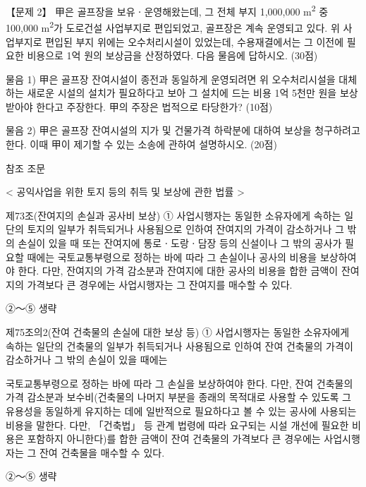 \begin{longquestion}{【문제 2】}
甲은 골프장을 보유ㆍ운영해왔는데, 그 전체 부지 1,000,000 m\textsuperscript{2} 중 100,000 m\textsuperscript{2}가 도로건설 사업부지로 편입되었고, 골프장은 계속 운영되고 있다. 위 사업부지로 편입된 부지 위에는 오수처리시설이 있었는데, 수용재결에서는 그 이전에 필요한 비용으로 1억 원의 보상금을 산정하였다. 다음 물음에 답하시오. (30점) \par
\medskip\noindent 물음 1) 甲은 골프장 잔여시설이 종전과 동일하게 운영되려면 위 오수처리시설을 대체하는 새로운 시설의 설치가 필요하다고 보아 그 설치에 드는 비용 1억 5천만 원을 보상받아야 한다고 주장한다. 甲의 주장은 법적으로 타당한가? (10점) \par
\medskip\noindent 물음 2) 甲은 골프장 잔여시설의 지가 및 건물가격 하락분에 대하여 보상을 청구하려고 한다. 이때 甲이 제기할 수 있는 소송에 관하여 설명하시오. (20점) \par
\begin{framedtext}
참조 조문 \par
< 공익사업을 위한 토지 등의 취득 및 보상에 관한 법률 > \par
제73조(잔여지의 손실과 공사비 보상) ① 사업시행자는 동일한 소유자에게 속하는 일단의 토지의 일부가 취득되거나 사용됨으로 인하여 잔여지의 가격이 감소하거나 그 밖의 손실이 있을 때 또는 잔여지에 통로ㆍ도랑ㆍ담장 등의 신설이나 그 밖의 공사가 필요할 때에는 국토교통부령으로 정하는 바에 따라 그 손실이나 공사의 비용을 보상하여야 한다. 다만, 잔여지의 가격 감소분과 잔여지에 대한 공사의 비용을 합한 금액이 잔여지의 가격보다 큰 경우에는 사업시행자는 그 잔여지를 매수할 수 있다. \par
②～⑤ 생략 \par
제75조의2(잔여 건축물의 손실에 대한 보상 등) ① 사업시행자는 동일한 소유자에게 속하는 일단의 건축물의 일부가 취득되거나 사용됨으로 인하여 잔여 건축물의 가격이 감소하거나 그 밖의 손실이 있을 때에는 \par
국토교통부령으로 정하는 바에 따라 그 손실을 보상하여야 한다. 다만, 잔여 건축물의 가격 감소분과 보수비(건축물의 나머지 부분을 종래의 목적대로 사용할 수 있도록 그 유용성을 동일하게 유지하는 데에 일반적으로 필요하다고 볼 수 있는 공사에 사용되는 비용을 말한다. 다만, 「건축법」 등 관계 법령에 따라 요구되는 시설 개선에 필요한 비용은 포함하지 아니한다)를 합한 금액이 잔여 건축물의 가격보다 큰 경우에는 사업시행자는 그 잔여 건축물을 매수할 수 있다. \par
②～⑤ 생략 \par
\end{framedtext}
\end{longquestion}
